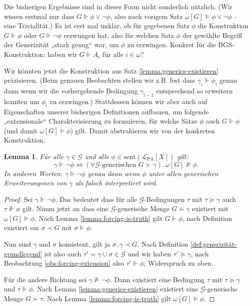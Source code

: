 \documentclass[nofonts]{uebung}
\newtheorem{lemma}[theorem]{Lemma}
\theoremstyle{definition}
\begin{document}
Die bisherigen Ergebnisse sind in dieser Form nicht sonderlich nützlich. (Wir wissen erstmal nur dass $G\Vdash \phi\lor\neg\phi$, also nach vorigem Satz $\omega[G] \vDash \phi\lor\neg\phi$ -- eine Trivialität.)
Es ist erst mal unklar, ob für gegebenen Satz $\phi$ die Konstruktion $G\Vdash \phi$ oder $G\Vdash\neg\phi$ erzwungen hat, also für welchen Satz $\phi$ der gewählte Begriff der Generizität „stark genug“ war, um $\phi$ zu erzwingen.  Konkret für die BGS-Konstruktion: haben wir $G\Vdash A_i$ für alle $i\in\omega$?

Wir könnten jetzt die Konstruktion aus Satz \ref{lemma:generics-existieren} präzisieren. (Beim genauen Beobachten stellen wir z.B. fest dass $\gamma_i\Vdash\phi_i$ genau dann wenn wir die vorhergehende Bedingung $\gamma_{i-1}$ entsprechend so erweitern konnten um $\phi_i$ zu erzwingen.)
Stattdessen können wir aber auch auf Eigenschaften unserer bisherigen Definitionen aufbauen, um folgende „extensionale“ Charakterisierung zu formuieren, für welche Sätze $\phi$ auch $G\Vdash \phi$ (und damit $\omega[G]\vDash\phi$) gilt. Damit abstrahieren wir von der konkreten Konstruktion.


\begin{lemma}
    Für alle $\gamma\in\mathcal G$ und alle $\phi\in \mathrm{sent}(\mathcal L_{\mathrm{PA}}[X])$ gilt:
    \[ \gamma\Vdash\neg\phi \iff (\forall\text{$\mathcal G$-generischen $G\succ\gamma$}).\, \omega[G]\not\vDash \phi. \]
    In anderen Worten: $\gamma\Vdash\neg\phi$ genau dann wenn $\phi$ unter allen generischen Erweiterungenen von $\gamma$ als falsch interpretiert wird.
\end{lemma}
\begin{proof}
    Sei $\gamma\Vdash\neg\phi$. Das bedeutet dass für alle $\mathcal G$-Bedingungen $\tau$ mit $\tau\succeq\gamma$ auch $\tau\not\Vdash \phi$ gilt.
    Nimm jetzt an dass eine $\mathcal G$-generische Menge $G\succ\gamma$ existiert mit $\omega[G]\vDash\phi$.
    Nach Lemma \ref{lemma:forcing-is-truth} gilt $G\Vdash\phi$, nach Definition existiert ein $\sigma\prec G$ mit $\sigma\Vdash\phi$.

    Nun sind $\gamma$ und $\sigma$ konsistent, gilt ja $\sigma,\gamma\prec G$.
    Nach Definition \ref{def:generizität-grundlegend} ist also auch $\tau'=\gamma\cup\sigma\in\mathcal G$ und wir haben $\tau'\succeq\gamma$, nach Beobachtung \ref{obs:forcing-extension} also $\tau'\Vdash\phi$; Widerspruch zu oben.

    Für die andere Richtung sei $\gamma\not\Vdash\neg\phi$. Dann existiert eine Bedingung $\tau$ mit $\tau\succeq\gamma$ und $\tau\Vdash\phi$.
    Nach Lemma \ref{lemma:generics-existieren} existiert eine $\mathcal G$-generische Menge $G\succ \tau$. Nach Lemma \ref{lemma:forcing-is-truth} gilt $\omega[G]\vDash\phi$.
\end{proof}
\end{document}
